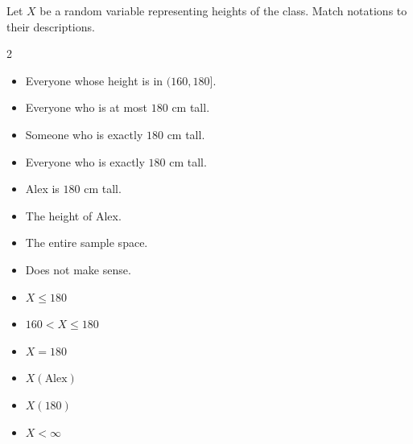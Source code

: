 \documentclass[../main.tex]{subfiles}
\begin{document}
\begin{exercise} \label{ex:random-variable-notation-match}
  Let \(X\) be a random variable representing heights of the class.  Match notations to their descriptions. 

  \begin{multicols}{2}
   \begin{itemize}
      \item Everyone whose height is in \((160, 180]\).
      \item Everyone who is at most \(180\) cm tall.
      \item Someone who is exactly \(180\) cm tall.
      \item Everyone who is exactly \(180\) cm tall.
      \item Alex is \(180\) cm tall.
      \item The height of Alex.
      \item The entire sample space.
      \item Does not make sense. 
    \end{itemize} 
    \columnbreak
    \begin{itemize}
      \item \(X \le 180\)
      \item \(160 < X \le 180\)
      \item \(X = 180\)
      \item \(X(\text{Alex})\)
      \item \(X(180)\)
      \item \( X < \infty\)
    \end{itemize}
  \end{multicols}
\end{exercise}

\clearpage
\end{document}
